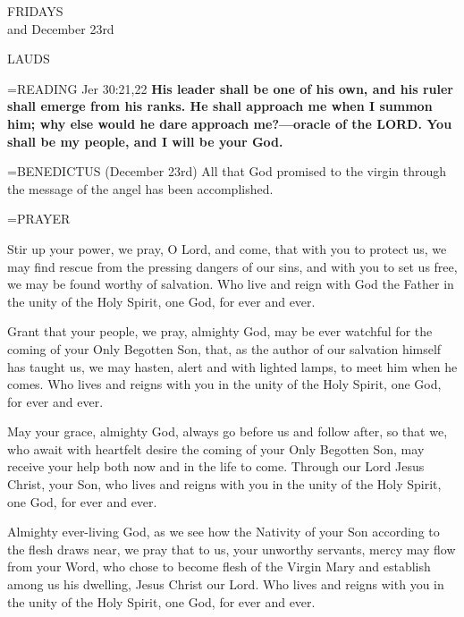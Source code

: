 \begin{center}\normalsize FRIDAYS\\
\footnotesize and December 23rd\\
\end{center}

\begin{flushleft}\normalsize LAUDS\\\end{flushleft}

\hangindent=\parindent \small{\uppercase{READING}} Jer 30:21,22 \textbf{His leader shall be one of his own, and his ruler shall emerge from his ranks. He shall approach me when I summon him; why else would he dare approach me?—oracle of the LORD. You shall be my people, and I will be your God.\\}

\hangindent=\parindent \small{BENEDICTUS  (December 23rd) All that God promised to the virgin through the message of the angel has been accomplished.\\}

\hangindent=\parindent \small PRAYER
\begin{description}[labelindent=\parindent, leftmargin=*]
\item [Week 1:]  Stir up your power, we pray, O Lord, and come, that with you to protect us, we may find rescue from the pressing dangers of our sins, and with you to set us free, we may be found worthy of salvation. Who live and reign with God the Father in the unity of the Holy Spirit, one God, for ever and ever.
\item [Week 2:]  Grant that your people, we pray, almighty God, may be ever watchful for the coming of your Only Begotten Son, that, as the author of our salvation himself has taught us, we may hasten, alert and with lighted lamps, to meet him when he comes. Who lives and reigns with you in the unity of the Holy Spirit, one God, for ever and ever.
\item [Week 3:]  May your grace, almighty God, always go before us and follow after, so that we, who await with heartfelt desire the coming of your Only Begotten Son, may receive your help both now and in the life to come. Through our Lord Jesus Christ, your Son, who lives and reigns with you in the unity of the Holy Spirit, one God, for ever and ever.
\item [December 23rd:]  Almighty ever-living God, as we see how the Nativity of your Son according to the flesh draws near, we pray that to us, your unworthy servants, mercy may flow from your Word, who chose to become flesh of the Virgin Mary and establish among us his dwelling, Jesus Christ our Lord. Who lives and reigns with you in the unity of the Holy Spirit, one God, for ever and ever.
\end{description}


